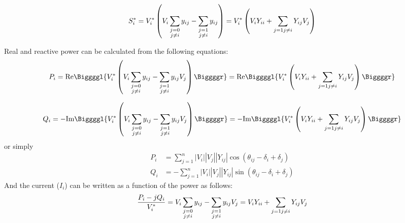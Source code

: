 \documentclass[11pt, oneside, reqno]{amsart}
\numberwithin{equation}{section}
\theoremstyle{plain}%
\theoremstyle{definition}
\theoremstyle{remark}
\begin{document}
\[
	S^*_i = V^*_i\left(V_i\sum_{\substack{j=0 \\ j\neq i}}y_{ij}-\sum_{\substack{j=1 \\ j\neq i}}y_{ij}\right)
	= V^*_i\left(V_i Y_{ii}+\sum_{j=1\\ j\neq i}Y_{ij}V_j\right)
\]

Real and reactive power can be calculated from the following equations:
\[
	P_i=\text{Re}\Biggggl\{V^*_i\left(V_i\sum_{\substack{j=0 \\ j\neq i}}y_{ij}-\sum_{\substack{j=1 \\ j\neq i}}y_{ij}V_j\right)\Biggggr\}=\text{Re}\Biggggl\{V^*_i\left(V_i Y_{ii}+\sum_{j=1\\ j\neq i}Y_{ij}V_j\right)\Biggggr\}
\]
	      
\[	
Q_i=-\text{Im}\Biggggl\{V^*_i\left(V_i\sum_{\substack{j=0 \\ j\neq i}}y_{ij}-\sum_{\substack{j=1 \\ j\neq i}}y_{ij}V_j\right)\Biggggr\}=-\text{Im}\Biggggl\{V^*_i\left(V_i Y_{ii}+\sum_{j=1\\ j\neq i}Y_{ij}V_j\right)\Biggggr\}
\]
or simply
\begin{align}
	P_i&=\sum^n_{j=1}|V_i||V_j||Y_{ij}|\cos(\theta_{ij}-\delta_i+\delta_j)\\
	Q_i&=-\sum^n_{j=1}|V_i||V_j||Y_{ij}|\sin(\theta_{ij}-\delta_i+\delta_j)
\end{align}
And the current ($I_i$) can be written as a function of the power as follows:
\[
 \frac{P_i-jQ_i}{V^*_i}=V_i\sum_{\substack{j=0 \\ j\neq i}}y_{ij}-\sum_{\substack{j=1 \\ j\neq i}}y_{ij}V_j = V_i Y_{ii}+\sum_{j=1\\ j\neq i}Y_{ij}V_j
\]
\end{document}
